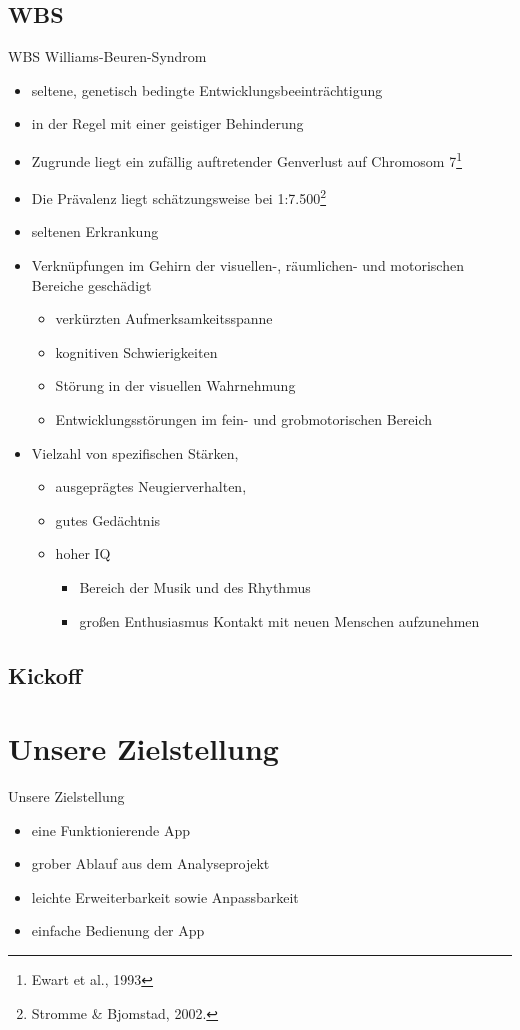 \documentclass[10pt,fleqn]{beamer}
\begin{document}
\subsection{WBS}
	\begin{frame}[t]{WBS Williams-Beuren-Syndrom}
		\begin{itemize}
			\item seltene, genetisch bedingte Entwicklungsbeeinträchtigung
			\item in der Regel mit einer geistiger Behinderung
			\item Zugrunde liegt ein zufällig auftretender Genverlust auf Chromosom 7\footnote{Ewart et al., 1993} 
			\item Die Prävalenz liegt schätzungsweise bei 1:7.500\footnote{Stromme \& Bjomstad, 2002.}
			\item seltenen Erkrankung
			\item Verknüpfungen im Gehirn der visuellen-, räumlichen- und motorischen Bereiche geschädigt
			\begin{itemize}
				\item verkürzten Aufmerksamkeitsspanne
				\item kognitiven Schwierigkeiten
				\item Störung in der visuellen Wahrnehmung
				\item Entwicklungsstörungen im fein- und grobmotorischen Bereich
			\end{itemize}
			\item Vielzahl von spezifischen Stärken,
			\begin{itemize}
				\item ausgeprägtes Neugierverhalten,
				\item gutes Gedächtnis
				\item hoher IQ
				\begin{itemize}
					\item Bereich der Musik und des Rhythmus
					\item großen Enthusiasmus Kontakt mit neuen Menschen aufzunehmen
				\end{itemize} 
			\end{itemize} 
		\end{itemize}
	\end{frame}

\subsection{Kickoff}

\section{Unsere Zielstellung}
\begin{frame}[t]{Unsere Zielstellung}
	\begin{itemize}
		\item eine Funktionierende App
		\item grober Ablauf aus dem Analyseprojekt
		\item leichte Erweiterbarkeit sowie Anpassbarkeit
		\item einfache Bedienung der App
	\end{itemize}
\end{frame}
\end{document}
